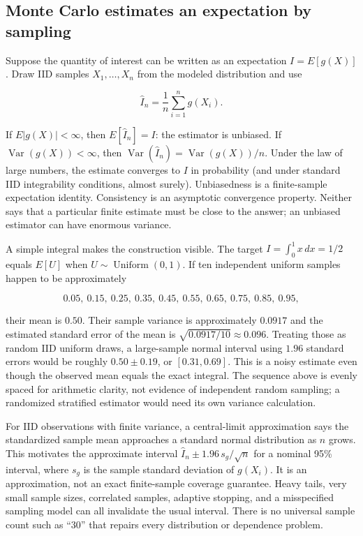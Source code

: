 \subsection{Monte Carlo estimates an expectation by sampling}\label{03-visual-computing-i-ch012-monte-carlo-estimates-an-expectation-by-sampling}

\hypertarget{03-visual-computing-i-ch012-monte-carlo-estimates-an-expectation-by-sampling}{}

Suppose the quantity of interest can be written as an expectation \(I=E[g(X)]\). Draw IID samples \(X_1,\ldots,X_n\) from the modeled distribution and use

\[
\hat I_n=\frac{1}{n}\sum_{i=1}^n g(X_i).
\]

If \(E|g(X)|<\infty\), then \(E[\hat I_n]=I\): the estimator is unbiased. If \(\operatorname{Var}(g(X))<\infty\), then \(\operatorname{Var}(\hat I_n)=\operatorname{Var}(g(X))/n\). Under the law of large numbers, the estimate converges to \(I\) in probability (and under standard IID integrability conditions, almost surely). Unbiasedness is a finite-sample expectation identity. Consistency is an asymptotic convergence property. Neither says that a particular finite estimate must be close to the answer; an unbiased estimator can have enormous variance.

A simple integral makes the construction visible. The target \(I=\int_0^1 x\,dx=1/2\) equals \(E[U]\) when \(U\sim\operatorname{Uniform}(0,1)\). If ten independent uniform samples happen to be approximately

\[
0.05,\ 0.15,\ 0.25,\ 0.35,\ 0.45,\ 0.55,\ 0.65,\ 0.75,\ 0.85,\ 0.95,
\]

their mean is \(0.50\). Their sample variance is approximately \(0.0917\) and the estimated standard error of the mean is \(\sqrt{0.0917/10}\approx0.096\). Treating those as random IID uniform draws, a large-sample normal interval using \(1.96\) standard errors would be roughly \(0.50\pm0.19\), or \([0.31,0.69]\). This is a noisy estimate even though the observed mean equals the exact integral. The sequence above is evenly spaced for arithmetic clarity, not evidence of independent random sampling; a randomized stratified estimator would need its own variance calculation.

For IID observations with finite variance, a central-limit approximation says the standardized sample mean approaches a standard normal distribution as \(n\) grows. This motivates the approximate interval \(\hat I_n\pm1.96\,s_g/\sqrt n\) for a nominal 95\% interval, where \(s_g\) is the sample standard deviation of \(g(X_i)\). It is an approximation, not an exact finite-sample coverage guarantee. Heavy tails, very small sample sizes, correlated samples, adaptive stopping, and a misspecified sampling model can all invalidate the usual interval. There is no universal sample count such as ``30'' that repairs every distribution or dependence problem.

